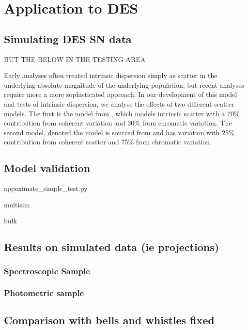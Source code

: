 \documentclass[a4paper,fleqn,usenatbib]{mnras}
\newcommand{\green}{\color{green}}
\newcommand{\gten}{\citetalias{Guy2010}}
\newcommand{\celeven}{\citetalias{Chotard2011}}
\begin{document}
\section{Application to DES}
\label{sec:des}

\subsection{Simulating DES SN data}
\label{sec:simdes}
{\green BUT THE BELOW IN THE TESTING AREA}

Early analyses often treated intrinsic dispersion simply as scatter in the underlying absolute magnitude of the underlying population, but recent analyses require more a more sophisticated approach. In our development of this model and tests of intrinsic dispersion, we analyse the effects of two different scatter models. The first is the model from \citet[][hereafter denoted the {\gten} scatter model]{Guy2010}, which models intrinsic scatter with a 70\% contribution from coherent variation and 30\% from chromatic variation. The second model, denoted the {\celeven} model is sourced from \citet{Chotard2011} and has variation with 25\% contribution from coherent scatter and 75\% from chromatic variation.

\subsection{Model validation}

appoximate\_simple\_test.py

multisim

bulk


\subsection{Results on simulated data (ie projections)}

\subsubsection{Spectroscopic Sample}

\subsubsection{Photometric sample}

\subsection{Comparison with bells and whistles fixed}
\end{document}

